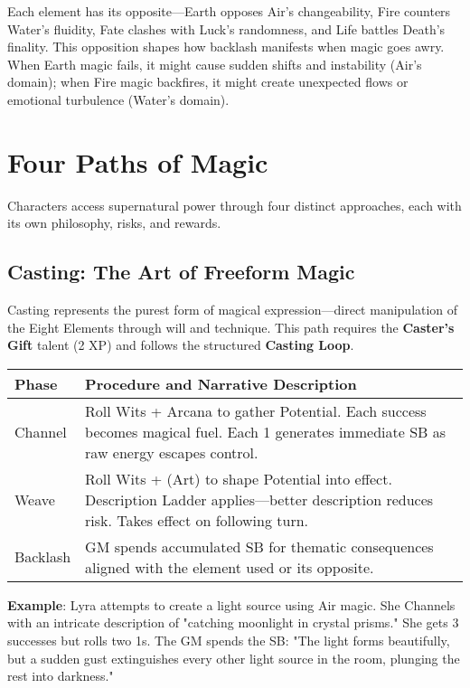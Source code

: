 Each element has its opposite—Earth opposes Air's changeability, Fire counters Water's fluidity, Fate clashes with Luck's randomness, and Life battles Death's finality. This opposition shapes how backlash manifests when magic goes awry. When Earth magic fails, it might cause sudden shifts and instability (Air's domain); when Fire magic backfires, it might create unexpected flows or emotional turbulence (Water's domain).

\section*{Four Paths of Magic}

Characters access supernatural power through four distinct approaches, each with its own philosophy, risks, and rewards.

\subsection*{Casting: The Art of Freeform Magic}

Casting represents the purest form of magical expression—direct manipulation of the Eight Elements through will and technique. This path requires the \textbf{Caster's Gift} talent (2 XP) and follows the structured \textbf{Casting Loop}.

\begin{fatebox}
\begin{tabularx}{\textwidth}{lp{}}
\toprule
\textbf{Phase} & \textbf{Procedure and Narrative Description} \\
\midrule
Channel & Roll Wits + Arcana to gather Potential. Each success becomes magical fuel. Each 1 generates immediate SB as raw energy escapes control. \\
Weave & Roll Wits + (Art) to shape Potential into effect. Description Ladder applies—better description reduces risk. Takes effect on following turn. \\
Backlash & GM spends accumulated SB for thematic consequences aligned with the element used or its opposite. \\
\bottomrule
\end{tabularx}
\end{fatebox}

\textbf{Example}: Lyra attempts to create a light source using Air magic. She Channels with an intricate description of "catching moonlight in crystal prisms." She gets 3 successes but rolls two 1s. The GM spends the SB: "The light forms beautifully, but a sudden gust extinguishes every other light source in the room, plunging the rest into darkness."

